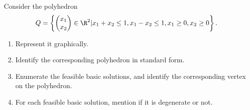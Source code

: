 Consider the polyhedron
\[
Q = \left\{
\begin{pmatrix}
x_1\\
x_2
\end{pmatrix} \in \R^2
| x_1 + x_2 \leq 1, x_1 - x_2 \leq 1, x_1 \geq 0, x_2 \geq 0\right\}.
\]

\begin{enumerate}
\item Represent it graphically.
\item Identify the corresponding polyhedron in standard form.
\item Enumerate the feasible basic solutions, and identify the
  corresponding vertex on the polyhedron.
\item For each feasible basic solution, mention if it is degenerate or
  not.  
\end{enumerate}
